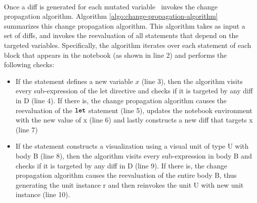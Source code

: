 \\
Once a diff is generated for each mutated variable \projname\ invokes the change propagation algorithm. Algorithm \ref{algo:change-propagation-algorithm} summarizes this change propagation algorithm. This algorithm takes as input a set of diffs, and invokes the reevaluation of all statements that depend on the targeted variables. Specifically, the algorithm iterates over each statement of each block that appears in the notebook (as shown in line 2) and performs the following checks:

\begin{itemize}
\item If the statement defines a new variable $x$ (line 3), then the algorithm visits every sub-expression of the let directive and checks if it is targeted by any diff in D (line 4). If there is, the change propagation algorithm causes the reevaluation of the $\texttt{\textbf{let}}$ statement (line 5), updates the notebook environment with the new value of x (line 6) and lastly constructs a new diff that targets x (line 7)

\item If the statement constructs a visualization using a visual unit of type U with body B (line 8), then the algorithm visits every sub-expression in body B and checks if it is targeted by any diff in D (line 9). If there is, the change propagation algorithm causes the reevaluation of the entire body B, thus generating the unit instance r and then reinvokes the unit U with new unit instance (line 10).



\end{itemize}

